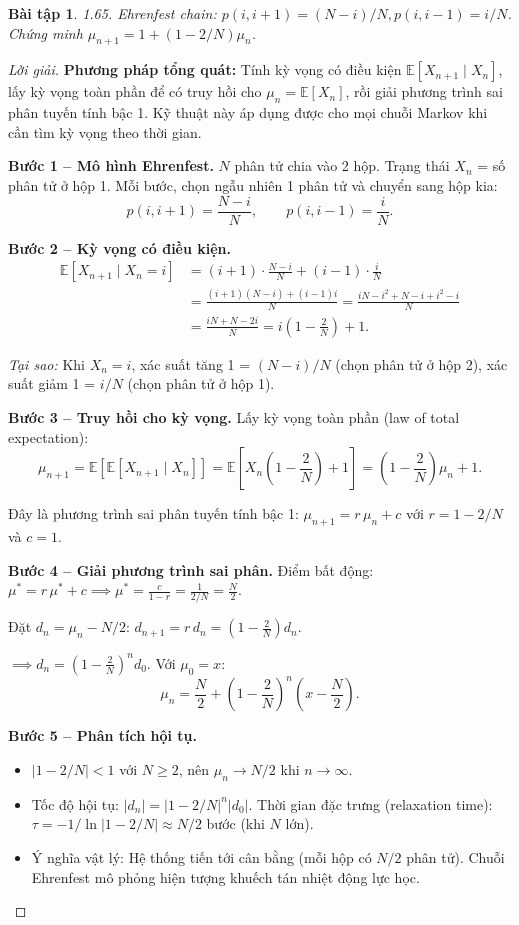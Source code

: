\documentclass[8pt,a4paper]{article}
\newtheorem{exercise}{Bài tập}
\newenvironment{solution}{\begin{proof}[Lời giải]}{\end{proof}}
\newcommand{\E}{\mathbb{E}}
\begin{document}
\begin{exercise}
1.65. Ehrenfest chain: $p(i, i+1) = (N-i)/N, p(i, i-1) = i/N$. Chứng minh $\mu_{n+1} = 1 + (1-2/N)\mu_n$.
\end{exercise}
\begin{solution}
\textbf{Phương pháp tổng quát:} Tính kỳ vọng có điều kiện $\E[X_{n+1} \mid X_n]$, lấy kỳ vọng toàn phần để có truy hồi cho $\mu_n = \E[X_n]$, rồi giải phương trình sai phân tuyến tính bậc 1. Kỹ thuật này áp dụng được cho mọi chuỗi Markov khi cần tìm kỳ vọng theo thời gian.

\textbf{Bước 1 -- Mô hình Ehrenfest.}
$N$ phân tử chia vào 2 hộp. Trạng thái $X_n$ = số phân tử ở hộp 1. Mỗi bước, chọn ngẫu nhiên 1 phân tử và chuyển sang hộp kia:
\[
  p(i, i+1) = \frac{N-i}{N}, \qquad p(i, i-1) = \frac{i}{N}.
\]

\textbf{Bước 2 -- Kỳ vọng có điều kiện.}
\begin{align*}
  \E[X_{n+1} \mid X_n = i] &= (i+1) \cdot \frac{N-i}{N} + (i-1) \cdot \frac{i}{N} \\
  &= \frac{(i+1)(N-i) + (i-1)i}{N} = \frac{iN - i^2 + N - i + i^2 - i}{N} \\
  &= \frac{iN + N - 2i}{N} = i\left(1 - \frac{2}{N}\right) + 1.
\end{align*}

\textit{Tại sao:} Khi $X_n = i$, xác suất tăng 1 = $(N-i)/N$ (chọn phân tử ở hộp 2), xác suất giảm 1 = $i/N$ (chọn phân tử ở hộp 1).

\textbf{Bước 3 -- Truy hồi cho kỳ vọng.}
Lấy kỳ vọng toàn phần (law of total expectation):
\[
  \mu_{n+1} = \E[\E[X_{n+1} \mid X_n]] = \E\left[X_n\left(1 - \frac{2}{N}\right) + 1\right] = \left(1 - \frac{2}{N}\right) \mu_n + 1.
\]

Đây là phương trình sai phân tuyến tính bậc 1: $\mu_{n+1} = r\, \mu_n + c$ với $r = 1 - 2/N$ và $c = 1$.

\textbf{Bước 4 -- Giải phương trình sai phân.}
Điểm bất động: $\mu^* = r\, \mu^* + c \implies \mu^* = \frac{c}{1-r} = \frac{1}{2/N} = \frac{N}{2}$.

Đặt $d_n = \mu_n - N/2$: $d_{n+1} = r\, d_n = \left(1 - \frac{2}{N}\right) d_n$.

$\implies d_n = \left(1 - \frac{2}{N}\right)^n d_0$. Với $\mu_0 = x$:
\[
  \boxed{\mu_n = \frac{N}{2} + \left(1 - \frac{2}{N}\right)^n \left(x - \frac{N}{2}\right)}.
\]

\textbf{Bước 5 -- Phân tích hội tụ.}
\begin{itemize}[nosep]
  \item $|1 - 2/N| < 1$ với $N \geq 2$, nên $\mu_n \to N/2$ khi $n \to \infty$.
  \item Tốc độ hội tụ: $|d_n| = |1-2/N|^n |d_0|$. Thời gian đặc trưng (relaxation time): $\tau = -1/\ln|1-2/N| \approx N/2$ bước (khi $N$ lớn).
  \item Ý nghĩa vật lý: Hệ thống tiến tới cân bằng (mỗi hộp có $N/2$ phân tử). Chuỗi Ehrenfest mô phỏng hiện tượng khuếch tán nhiệt động lực học.
\end{itemize}


\end{solution}
\end{document}
